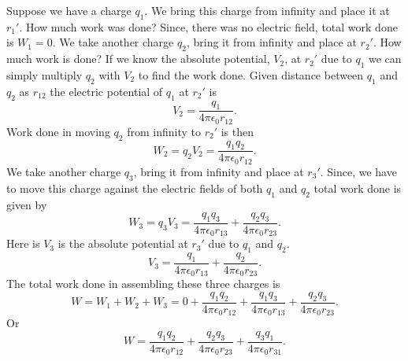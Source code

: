 \documentclass[12pt,a4paper]{article}
\begin{document}
Suppose we have a charge $q_1$. We bring this charge from infinity and place it at $r_1'$. How much work was done? Since, there was no electric field, total work done is $W_1=0$. We take another charge $q_2$, bring it from infinity and place at $r_2'$. How much work is done? If we know the absolute potential, $V_2$, at $r_2'$ due to $q_1$ we can simply multiply $q_2$ with $V_2$ to find the work done. Given distance between $q_1$ and $q_2$ as $r_{12}$ the electric potential of $q_1$ at $r_2'$ is
\begin{equation}
V_2=\dfrac{q_1}{4\pi\epsilon_0r_{12}}.
\end{equation}
Work done in moving $q_2$ from infinity to $r_2'$ is then
\begin{equation}
W_2=q_2V_2=\dfrac{q_1q_2}{4\pi\epsilon_0r_{12}}.
\end{equation}
We take another charge $q_3$, bring it from infinity and place at $r_3'$. Since, we have to move this charge against the electric fields of both $q_1$ and $q_2$ total work done is given by
\begin{equation}
W_3=q_3V_3=\dfrac{q_1q_3}{4\pi\epsilon_0r_{13}}+\dfrac{q_2q_3}{4\pi\epsilon_0r_{23}}.
\end{equation}
Here is $V_3$ is the absolute potential at $r_3'$ due to $q_1$ and $q_2$.
\begin{equation}
V_3=\dfrac{q_1}{4\pi\epsilon_0r_{13}}+\dfrac{q_2}{4\pi\epsilon_0r_{23}}.
\end{equation}
The total work done in assembling these three charges is
\begin{equation}
W=W_1+W_2+W_3=0+\dfrac{q_1q_2}{4\pi\epsilon_0r_{12}}+\dfrac{q_1q_3}{4\pi\epsilon_0r_{13}}+\dfrac{q_2q_3}{4\pi\epsilon_0r_{23}}.
\end{equation}
Or
\begin{equation}
W=\dfrac{q_1q_2}{4\pi\epsilon_0r_{12}}+\dfrac{q_2q_3}{4\pi\epsilon_0r_{23}}+\dfrac{q_3q_1}{4\pi\epsilon_0r_{31}}.
\end{equation}
\end{document}
